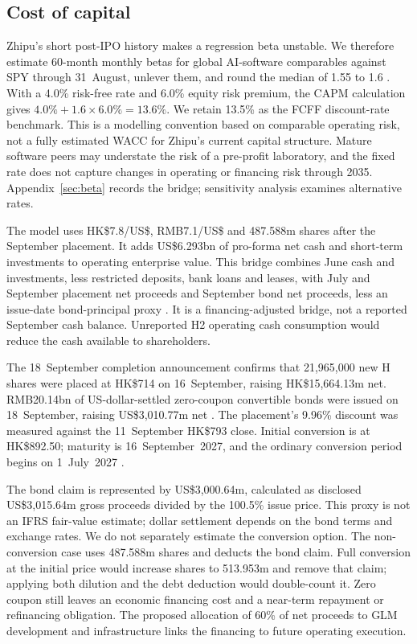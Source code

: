 \documentclass[11pt]{article}
\begin{document}
\subsection{Cost of capital}
Zhipu's short post-IPO history makes a regression beta unstable. We therefore estimate 60-month monthly betas for global AI-software comparables against SPY through 31~August, unlever them, and round the median of 1.55 to 1.6 \citep{nasdaqsec2026}. With a 4.0\% risk-free rate and 6.0\% equity risk premium, the CAPM calculation gives $4.0\%+1.6\times6.0\%=13.6\%$. We retain 13.5\% as the FCFF discount-rate benchmark. This is a modelling convention based on comparable operating risk, not a fully estimated WACC for Zhipu's current capital structure. Mature software peers may understate the risk of a pre-profit laboratory, and the fixed rate does not capture changes in operating or financing risk through 2035. Appendix~\ref{sec:beta} records the bridge; sensitivity analysis examines alternative rates.

The model uses HK\$7.8/US\$, RMB7.1/US\$ and 487.588m shares after the September placement. It adds US\$6.293bn of pro-forma net cash and short-term investments to operating enterprise value. This bridge combines June cash and investments, less restricted deposits, bank loans and leases, with July and September placement net proceeds and September bond net proceeds, less an issue-date bond-principal proxy \citep{interim2026,placement2513,zhipucompletion2026}. It is a financing-adjusted bridge, not a reported September cash balance. Unreported H2 operating cash consumption would reduce the cash available to shareholders.

The 18~September completion announcement confirms that 21,965,000 new H shares were placed at HK\$714 on 16~September, raising HK\$15,664.13m net. RMB20.14bn of US-dollar-settled zero-coupon convertible bonds were issued on 18~September, raising US\$3,010.77m net \citep{zhipucompletion2026}. The placement's 9.96\% discount was measured against the 11~September HK\$793 close. Initial conversion is at HK\$892.50; maturity is 16~September~2027, and the ordinary conversion period begins on 1~July~2027 \citep{zhipufinancing2026}.

The bond claim is represented by US\$3,000.64m, calculated as disclosed US\$3,015.64m gross proceeds divided by the 100.5\% issue price. This proxy is not an IFRS fair-value estimate; dollar settlement depends on the bond terms and exchange rates. We do not separately estimate the conversion option. The non-conversion case uses 487.588m shares and deducts the bond claim. Full conversion at the initial price would increase shares to 513.953m and remove that claim; applying both dilution and the debt deduction would double-count it. Zero coupon still leaves an economic financing cost and a near-term repayment or refinancing obligation. The proposed allocation of 60\% of net proceeds to GLM development and infrastructure links the financing to future operating execution.
\end{document}
